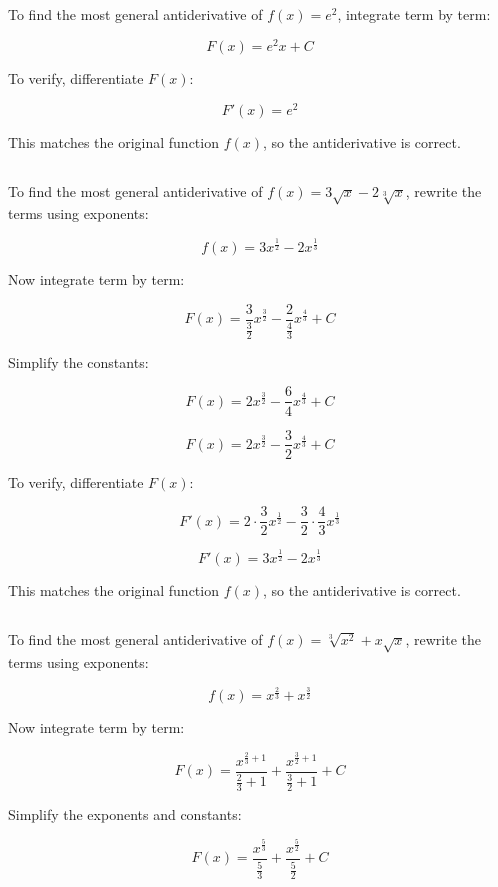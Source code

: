 \documentclass{article}
\begin{document}
\subsection{}
To find the most general antiderivative of \( f(x) = e^2 \), integrate term by term:

\[
F(x) = e^2 x + C
\]

To verify, differentiate \( F(x) \):

\[
F'(x) = e^2
\]

This matches the original function \( f(x) \), so the antiderivative is correct.
\subsection{}
To find the most general antiderivative of \( f(x) = 3\sqrt{x} - 2\sqrt[3]{x} \), rewrite the terms using exponents:

\[
f(x) = 3x^{\frac{1}{2}} - 2x^{\frac{1}{3}}
\]

Now integrate term by term:

\[
F(x) = \frac{3}{\frac{3}{2}} x^{\frac{3}{2}} - \frac{2}{\frac{4}{3}} x^{\frac{4}{3}} + C
\]

Simplify the constants:

\[
F(x) = 2x^{\frac{3}{2}} - \frac{6}{4} x^{\frac{4}{3}} + C
\]

\[
F(x) = 2x^{\frac{3}{2}} - \frac{3}{2}x^{\frac{4}{3}} + C
\]

To verify, differentiate \( F(x) \):

\[
F'(x) = 2 \cdot \frac{3}{2} x^{\frac{1}{2}} - \frac{3}{2} \cdot \frac{4}{3} x^{\frac{1}{3}}
\]

\[
F'(x) = 3x^{\frac{1}{2}} - 2x^{\frac{1}{3}}
\]

This matches the original function \( f(x) \), so the antiderivative is correct.
\subsection{}
To find the most general antiderivative of \( f(x) = \sqrt[3]{x^2} + x\sqrt{x} \), rewrite the terms using exponents:

\[
f(x) = x^{\frac{2}{3}} + x^{\frac{3}{2}}
\]

Now integrate term by term:

\[
F(x) = \frac{x^{\frac{2}{3}+1}}{\frac{2}{3}+1} + \frac{x^{\frac{3}{2}+1}}{\frac{3}{2}+1} + C
\]

Simplify the exponents and constants:

\[
F(x) = \frac{x^{\frac{5}{3}}}{\frac{5}{3}} + \frac{x^{\frac{5}{2}}}{\frac{5}{2}} + C
\]
\end{document}
